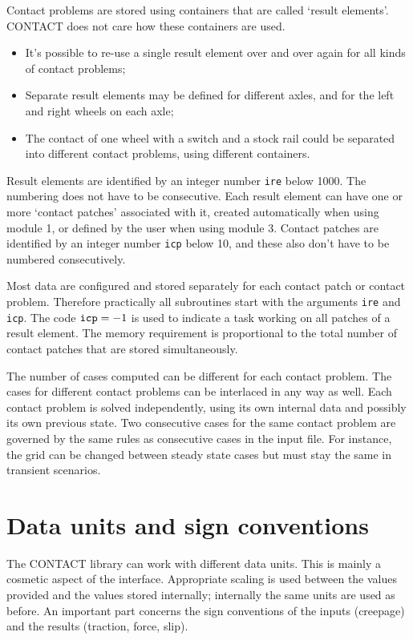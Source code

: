 \documentclass[12pt]{report}
\begin{document}
Contact problems are stored using containers that are called `result
elements'. CONTACT does not care how these containers are used. 
\begin{itemize}
\item It's possible to re-use a single result element over and over again
        for all kinds of contact problems;
\item Separate result elements may be defined for different axles, and for
        the left and right wheels on each axle;
\item The contact of one wheel with a switch and a stock rail could be
        separated into different contact problems, using different
        containers.
\end{itemize}
Result elements are identified by an integer number {\tt ire} below 1000.
The numbering does not have to be consecutive. Each result element can have
one or more `contact patches' associated with it, created automatically
when using module 1, or defined by the user when using module 3. Contact
patches are identified by an integer number {\tt icp} below 10, and these
also don't have to be numbered consecutively.

Most data are configured and stored separately for each contact patch or
contact problem.  Therefore practically all subroutines start with the
arguments {\tt ire} and {\tt icp}. The code ${\tt icp}=-1$ is used to
indicate a task working on all patches of a result element. The memory
requirement is proportional to the total number of contact patches that are
stored simultaneously.

The number of cases computed can be different for each contact problem.
The cases for different contact problems can be interlaced in any way as
well. Each contact problem is solved independently, using its own internal
data and possibly its own previous state. Two consecutive cases for the
same contact problem are governed by the same rules as consecutive cases in
the input file. For instance, the grid can be changed between steady state
cases but must stay the same in transient scenarios.

\section{Data units and sign conventions}
\label{sec:units}

The CONTACT library can work with different data units. This is mainly a
cosmetic aspect of the interface. Appropriate scaling is used between the
values provided and the values stored internally; internally the same
units are used as before. An important part concerns the sign conventions
of the inputs (creepage) and the results (traction, force, slip).
\end{document}
